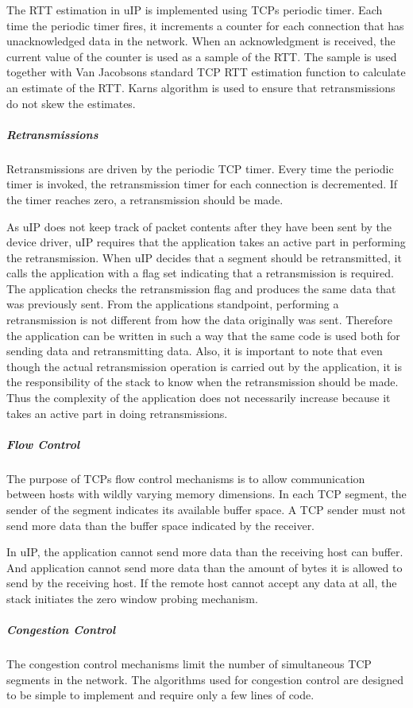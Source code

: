 The R\+TT estimation in u\+IP is implemented using T\+CP\textquotesingle{}s periodic timer. Each time the periodic timer fires, it increments a counter for each connection that has unacknowledged data in the network. When an acknowledgment is received, the current value of the counter is used as a sample of the R\+TT. The sample is used together with Van Jacobson\textquotesingle{}s standard T\+CP R\+TT estimation function to calculate an estimate of the R\+TT. Karn\textquotesingle{}s algorithm is used to ensure that retransmissions do not skew the estimates.\hypertarget{a00074_rexmit}{}\subparagraph{Retransmissions}\label{a00074_rexmit}
Retransmissions are driven by the periodic T\+CP timer. Every time the periodic timer is invoked, the retransmission timer for each connection is decremented. If the timer reaches zero, a retransmission should be made.

As u\+IP does not keep track of packet contents after they have been sent by the device driver, u\+IP requires that the application takes an active part in performing the retransmission. When u\+IP decides that a segment should be retransmitted, it calls the application with a flag set indicating that a retransmission is required. The application checks the retransmission flag and produces the same data that was previously sent. From the application\textquotesingle{}s standpoint, performing a retransmission is not different from how the data originally was sent. Therefore the application can be written in such a way that the same code is used both for sending data and retransmitting data. Also, it is important to note that even though the actual retransmission operation is carried out by the application, it is the responsibility of the stack to know when the retransmission should be made. Thus the complexity of the application does not necessarily increase because it takes an active part in doing retransmissions.\hypertarget{a00074_flowcontrol}{}\subparagraph{Flow Control}\label{a00074_flowcontrol}
The purpose of T\+CP\textquotesingle{}s flow control mechanisms is to allow communication between hosts with wildly varying memory dimensions. In each T\+CP segment, the sender of the segment indicates its available buffer space. A T\+CP sender must not send more data than the buffer space indicated by the receiver.

In u\+IP, the application cannot send more data than the receiving host can buffer. And application cannot send more data than the amount of bytes it is allowed to send by the receiving host. If the remote host cannot accept any data at all, the stack initiates the zero window probing mechanism.\hypertarget{a00074_congestioncontrol}{}\subparagraph{Congestion Control}\label{a00074_congestioncontrol}
The congestion control mechanisms limit the number of simultaneous T\+CP segments in the network. The algorithms used for congestion control are designed to be simple to implement and require only a few lines of code.

